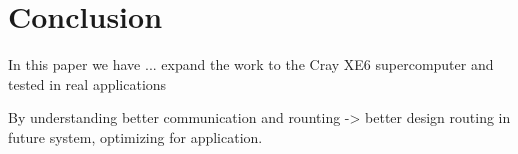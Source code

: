 \section{Conclusion}
\label{sec:conclusion}

In this paper we have ...
expand the work to the Cray XE6 supercomputer and tested in real applications 

By understanding better communication and rounting -> better design routing in future system, optimizing for application.
